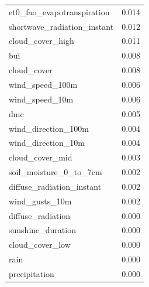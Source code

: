 \begin{table}[H]
\begin{tabular}{lc}
		et0\_fao\_evapotranspiration          & 0.014       \\ 
		shortwave\_radiation\_instant         & 0.012       \\ 
		cloud\_cover\_high                     & 0.011       \\ 
		bui                                    & 0.008       \\ 
		cloud\_cover                          & 0.008       \\ 
		wind\_speed\_100m                     & 0.006       \\ 
		wind\_speed\_10m                      & 0.006       \\ 
		dmc                                    & 0.005       \\ 
		wind\_direction\_100m                 & 0.004       \\ 
		wind\_direction\_10m                  & 0.004       \\ 
		cloud\_cover\_mid                     & 0.003       \\ 
		soil\_moisture\_0\_to\_7cm            & 0.002       \\ 
		diffuse\_radiation\_instant           & 0.002       \\ 
		wind\_gusts\_10m                      & 0.002       \\ 
		diffuse\_radiation                    & 0.000       \\ 
		sunshine\_duration                    & 0.000       \\ 
		cloud\_cover\_low                     & 0.000       \\ 
		rain                                  & 0.000       \\ 
		precipitation                         & 0.000       \\ 
	\end{tabular}
\end{table}


